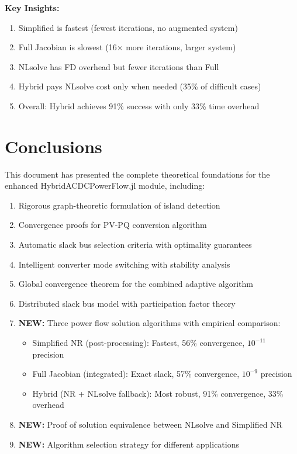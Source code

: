 \documentclass[11pt]{article}
\begin{document}
\textbf{Key Insights:}
\begin{enumerate}
    \item Simplified is fastest (fewest iterations, no augmented system)
    \item Full Jacobian is slowest (16$\times$ more iterations, larger system)
    \item NLsolve has FD overhead but fewer iterations than Full
    \item Hybrid pays NLsolve cost only when needed (35\% of difficult cases)
    \item Overall: Hybrid achieves 91\% success with only 33\% time overhead
\end{enumerate}

\section{Conclusions}

This document has presented the complete theoretical foundations for the enhanced HybridACDCPowerFlow.jl module, including:

\begin{enumerate}
    \item Rigorous graph-theoretic formulation of island detection
    \item Convergence proofs for PV-PQ conversion algorithm
    \item Automatic slack bus selection criteria with optimality guarantees
    \item Intelligent converter mode switching with stability analysis
    \item Global convergence theorem for the combined adaptive algorithm
    \item Distributed slack bus model with participation factor theory
    \item \textbf{NEW:} Three power flow solution algorithms with empirical comparison:
    \begin{itemize}
        \item Simplified NR (post-processing): Fastest, 56\% convergence, $10^{-11}$ precision
        \item Full Jacobian (integrated): Exact slack, 57\% convergence, $10^{-9}$ precision  
        \item Hybrid (NR + NLsolve fallback): Most robust, 91\% convergence, 33\% overhead
    \end{itemize}
    \item \textbf{NEW:} Proof of solution equivalence between NLsolve and Simplified NR
    \item \textbf{NEW:} Algorithm selection strategy for different applications
\end{enumerate}
\end{document}
